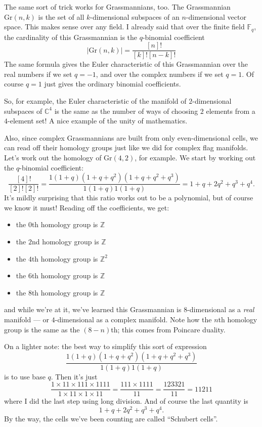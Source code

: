 \documentclass{article}
\def\tightlist{}
\begin{document}
The same sort of trick works for Grassmannians, too. The Grassmannian
\(\mathrm{Gr}(n,k)\) is the set of all \(k\)-dimensional subspaces of an
\(n\)-dimensional vector space. This makes sense over any field. I
already said that over the finite field \(\mathbb{F}_q\), the
cardinality of this Grassmannian is the \(q\)-binomial coefficient
\[|\mathrm{Gr}(n,k)| = \frac{[n]!}{[k]![n-k]!}\] The same formula gives
the Euler characteristic of this Grassmannian over the real numbers if
we set \(q = -1\), and over the complex numbers if we set \(q = 1\). Of
course \(q = 1\) just gives the ordinary binomial coefficients.

So, for example, the Euler characteristic of the manifold of
\(2\)-dimensional subspaces of \(\mathbb{C}^4\) is the same as the
number of ways of choosing \(2\) elements from a \(4\)-element set! A
nice example of the unity of mathematics.

Also, since complex Grassmannians are built from only even-dimensional
cells, we can read off their homology groups just like we did for
complex flag manifolds. Let's work out the homology of
\(\mathrm{Gr}(4,2)\), for example. We start by working out the
\(q\)-binomial coefficient:
\[\frac{[4]!}{[2]![2]!} = \frac{1(1+q)(1+q+q^2)(1+q+q^2+q^3)}{1(1+q)1(1+q)} = 1+q+2q^2+q^3+q^4.\]
It's mildly surprising that this ratio works out to be a polynomial, but
of course we know it must! Reading off the coefficients, we get:

\begin{itemize}
\tightlist
\item
  the \(0\)th homology group is \(\mathbb{Z}\)
\item
  the \(2\)nd homology group is \(\mathbb{Z}\)
\item
  the \(4\)th homology group is \(\mathbb{Z}^2\)
\item
  the \(6\)th homology group is \(\mathbb{Z}\)
\item
  the \(8\)th homology group is \(\mathbb{Z}\)
\end{itemize}

and while we're at it, we've learned this Grassmannian is 8-dimensional
as a \emph{real} manifold --- or \(4\)-dimensional as a complex
manifold. Note how the \(n\)th homology group is the same as the
\((8-n)\)th; this comes from Poincare duality.

On a lighter note: the best way to simplify this sort of expression
\[\frac{1(1+q)(1+q+q^2)(1+q+q^2+q^3)}{1(1+q)1(1+q)}\] is to use base
\(q\). Then it's just
\[\frac{1\times11\times111\times1111}{1\times11\times1\times11} = \frac{111\times1111}{11} = \frac{123321}{11} = 11211\]
where I did the last step using long division. And of course the last
quantity is \[1+q+2q^2+q^3+q^4.\] By the way, the cells we've been
counting are called ``Schubert cells''.
\end{document}
